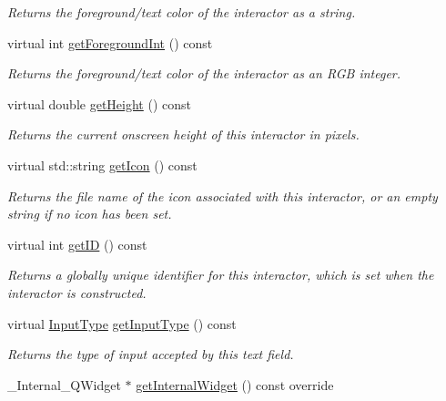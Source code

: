 \begin{DoxyCompactItemize}
\begin{DoxyCompactList}\small\item\em Returns the foreground/text color of the interactor as a string. \end{DoxyCompactList}\item 
virtual int \mbox{\hyperlink{classsgl_1_1GInteractor_ac3b12ab385a6ef9ae90fc879860ba726}{get\+Foreground\+Int}} () const
\begin{DoxyCompactList}\small\item\em Returns the foreground/text color of the interactor as an R\+GB integer. \end{DoxyCompactList}\item 
virtual double \mbox{\hyperlink{classsgl_1_1GInteractor_a1e7e353362434072875264cf95629f99}{get\+Height}} () const
\begin{DoxyCompactList}\small\item\em Returns the current onscreen height of this interactor in pixels. \end{DoxyCompactList}\item 
virtual std\+::string \mbox{\hyperlink{classsgl_1_1GInteractor_aaed62a73004939a64da6f0eb9eb64d73}{get\+Icon}} () const
\begin{DoxyCompactList}\small\item\em Returns the file name of the icon associated with this interactor, or an empty string if no icon has been set. \end{DoxyCompactList}\item 
virtual int \mbox{\hyperlink{classsgl_1_1GInteractor_a9c9659a6c6ba66b4107ba59c95a24241}{get\+ID}} () const
\begin{DoxyCompactList}\small\item\em Returns a globally unique identifier for this interactor, which is set when the interactor is constructed. \end{DoxyCompactList}\item 
virtual \mbox{\hyperlink{classsgl_1_1GTextField_a5fc772c800c3d40d2b95564e8a839bab}{Input\+Type}} \mbox{\hyperlink{classsgl_1_1GTextField_a69cc7c223d780203ab2852ee5a881753}{get\+Input\+Type}} () const
\begin{DoxyCompactList}\small\item\em Returns the type of input accepted by this text field. \end{DoxyCompactList}\item 
\+\_\+\+Internal\+\_\+\+Q\+Widget $\ast$ \mbox{\hyperlink{classsgl_1_1GTextField_a2f6b36b2517087dc90a366b5ce1f5323}{get\+Internal\+Widget}} () const override

\end{DoxyCompactItemize}
